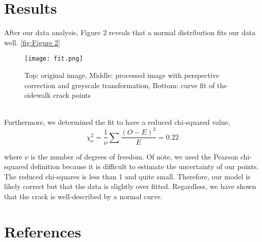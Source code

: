 \documentclass{article}
\begin{document}
\section{Results}
After our data analysis, Figure 2 reveals that a normal distribution fits our data well. \autoref{fig:Figure 2}
\begin{figure}[h]
    \centering
    \texttt{[image: fit.png]}
    \caption{Top: original image, Middle: processed image with perspective correction and greyscale transformation, Bottom: curve fit of the sidewalk crack points}
    \label{fig:Figure 2}
\end{figure}
\\Furthermore, we determined the fit to have a reduced chi-squared value,
\begin{equation}
    \chi_\nu^2 = \frac{1}{\nu}\sum\frac{(O-E)^2}{E} = 0.22
\end{equation}

where $\nu$ is the number of degrees of freedom. Of note, we used the Pearson chi-squared definition because it
is difficult to estimate the uncertainty of our points.
\\

The reduced chi-squares is less than 1 and quite small. Therefore, our model is likely correct but that the
data is slightly over fitted. Regardless, we have shown that the crack is well-described by a normal curve.

\section{References}


\nocite{*}

\cite{2020SciPy-NMeth}
\cite{2020NumPy-Array}
\end{document}
